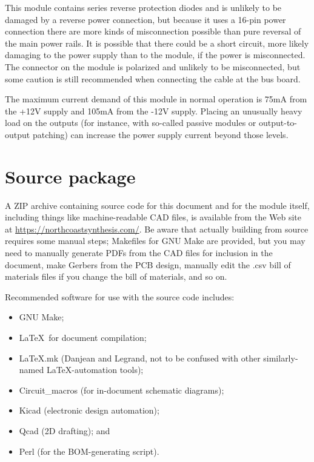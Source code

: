 This module contains series reverse protection diodes and is unlikely to be
damaged by a reverse power connection, but because it uses a 16-pin power
connection there are more kinds of misconnection possible than pure reversal
of the main power rails.  It is possible that there could be a short
circuit, more likely damaging to the power supply than to the module, if the
power is misconnected.  The connector on the module is polarized and
unlikely to be misconnected, but some caution is still recommended when
connecting the cable at the bus board.

The maximum current demand of this module in normal operation is 75mA from
the +12V supply and 105mA from the -12V supply.  Placing an unusually heavy
load on the outputs (for instance, with so-called passive modules or
output-to-output patching) can increase the power supply current beyond
those levels.

\section{Source package}

A ZIP archive containing source code for this document and for the module
itself, including things like machine-readable CAD files, is available from 
the Web site at 
\url{https://northcoastsynthesis.com/}.  Be aware that actually building
from source requires some manual steps; Makefiles for GNU Make are provided,
but you may need to manually generate PDFs from the CAD files for inclusion
in the document, make Gerbers from the PCB design, manually edit the .csv
bill of materials files if you change the bill of materials, and so on.

Recommended software for use with the source code includes:
\begin{itemize}
  \item GNU Make;
  \item \LaTeX\ for document compilation;
  \item LaTeX.mk (Danjean and Legrand, not to be confused with other
    similarly-named \LaTeX-automation tools);
  \item Circuit\_macros (for in-document schematic diagrams);
  \item Kicad (electronic design automation);
  \item Qcad (2D drafting); and
  \item Perl (for the BOM-generating script).
\end{itemize}

